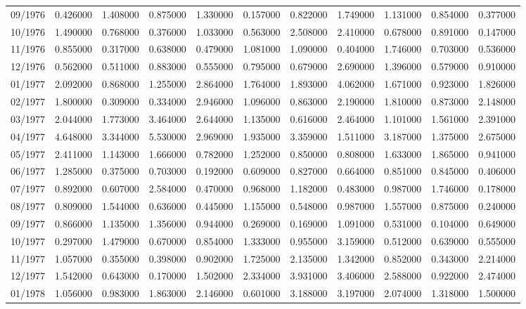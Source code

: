 \begin{tabular}{lrrrrrrrrrr}
09/1976 & 0.426000 & 1.408000 & 0.875000 & 1.330000 & 0.157000 & 0.822000 & 1.749000 & 1.131000 & 0.854000 & 0.377000 \\
10/1976 & 1.490000 & 0.768000 & 0.376000 & 1.033000 & 0.563000 & 2.508000 & 2.410000 & 0.678000 & 0.891000 & 0.147000 \\
11/1976 & 0.855000 & 0.317000 & 0.638000 & 0.479000 & 1.081000 & 1.090000 & 0.404000 & 1.746000 & 0.703000 & 0.536000 \\
12/1976 & 0.562000 & 0.511000 & 0.883000 & 0.555000 & 0.795000 & 0.679000 & 2.690000 & 1.396000 & 0.579000 & 0.910000 \\
01/1977 & 2.092000 & 0.868000 & 1.255000 & 2.864000 & 1.764000 & 1.893000 & 4.062000 & 1.671000 & 0.923000 & 1.826000 \\
02/1977 & 1.800000 & 0.309000 & 0.334000 & 2.946000 & 1.096000 & 0.863000 & 2.190000 & 1.810000 & 0.873000 & 2.148000 \\
03/1977 & 2.044000 & 1.773000 & 3.464000 & 2.644000 & 1.135000 & 0.616000 & 2.464000 & 1.101000 & 1.561000 & 2.391000 \\
04/1977 & 4.648000 & 3.344000 & 5.530000 & 2.969000 & 1.935000 & 3.359000 & 1.511000 & 3.187000 & 1.375000 & 2.675000 \\
05/1977 & 2.411000 & 1.143000 & 1.666000 & 0.782000 & 1.252000 & 0.850000 & 0.808000 & 1.633000 & 1.865000 & 0.941000 \\
06/1977 & 1.285000 & 0.375000 & 0.703000 & 0.192000 & 0.609000 & 0.827000 & 0.664000 & 0.851000 & 0.845000 & 0.406000 \\
07/1977 & 0.892000 & 0.607000 & 2.584000 & 0.470000 & 0.968000 & 1.182000 & 0.483000 & 0.987000 & 1.746000 & 0.178000 \\
08/1977 & 0.809000 & 1.544000 & 0.636000 & 0.445000 & 1.155000 & 0.548000 & 0.987000 & 1.557000 & 0.875000 & 0.240000 \\
09/1977 & 0.866000 & 1.135000 & 1.356000 & 0.944000 & 0.269000 & 0.169000 & 1.091000 & 0.531000 & 0.104000 & 0.649000 \\
10/1977 & 0.297000 & 1.479000 & 0.670000 & 0.854000 & 1.333000 & 0.955000 & 3.159000 & 0.512000 & 0.639000 & 0.555000 \\
11/1977 & 1.057000 & 0.355000 & 0.398000 & 0.902000 & 1.725000 & 2.135000 & 1.342000 & 0.852000 & 0.343000 & 2.214000 \\
12/1977 & 1.542000 & 0.643000 & 0.170000 & 1.502000 & 2.334000 & 3.931000 & 3.406000 & 2.588000 & 0.922000 & 2.474000 \\
01/1978 & 1.056000 & 0.983000 & 1.863000 & 2.146000 & 0.601000 & 3.188000 & 3.197000 & 2.074000 & 1.318000 & 1.500000 \\

\end{tabular}
